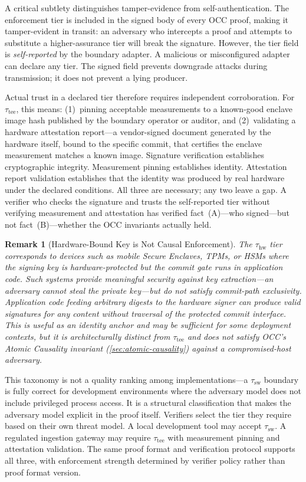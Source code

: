 \documentclass[11pt,letterpaper]{article}
\theoremstyle{occplain}
\theoremstyle{occremark}
\newtheorem{remark}{Remark}[section]
\begin{document}
A critical subtlety distinguishes tamper-evidence from self-authentication. The enforcement tier is included in the signed body of every OCC proof, making it tamper-evident in transit: an adversary who intercepts a proof and attempts to substitute a higher-assurance tier will break the signature. However, the tier field is \emph{self-reported} by the boundary adapter. A malicious or misconfigured adapter can declare any tier. The signed field prevents downgrade attacks during transmission; it does not prevent a lying producer.

Actual trust in a declared tier therefore requires independent corroboration. For $\tau_{\mathrm{tee}}$, this means: (1)~pinning acceptable measurements to a known-good enclave image hash published by the boundary operator or auditor, and (2)~validating a hardware attestation report---a vendor-signed document generated by the hardware itself, bound to the specific commit, that certifies the enclave measurement matches a known image. Signature verification establishes cryptographic integrity. Measurement pinning establishes identity. Attestation report validation establishes that the identity was produced by real hardware under the declared conditions. All three are necessary; any two leave a gap. A verifier who checks the signature and trusts the self-reported tier without verifying measurement and attestation has verified fact~(A)---who signed---but not fact~(B)---whether the OCC invariants actually held.

\begin{remark}[Hardware-Bound Key is Not Causal Enforcement]
\label{rem:hw-not-causal}
The $\tau_{\mathrm{hw}}$ tier corresponds to devices such as mobile Secure Enclaves, TPMs, or HSMs where the signing key is hardware-protected but the commit gate runs in application code. Such systems provide meaningful security against key extraction---an adversary cannot steal the private key---but do not satisfy commit-path exclusivity. Application code feeding arbitrary digests to the hardware signer can produce valid signatures for any content without traversal of the protected commit interface. This is useful as an identity anchor and may be sufficient for some deployment contexts, but it is architecturally distinct from $\tau_{\mathrm{tee}}$ and does not satisfy OCC's Atomic Causality invariant (\cref{sec:atomic-causality}) against a compromised-host adversary.
\end{remark}

This taxonomy is not a quality ranking among implementations---a $\tau_{\mathrm{sw}}$ boundary is fully correct for development environments where the adversary model does not include privileged process access. It is a structural classification that makes the adversary model explicit in the proof itself. Verifiers select the tier they require based on their own threat model. A local development tool may accept $\tau_{\mathrm{sw}}$. A regulated ingestion gateway may require $\tau_{\mathrm{tee}}$ with measurement pinning and attestation validation. The same proof format and verification protocol supports all three, with enforcement strength determined by verifier policy rather than proof format version.
\end{document}
